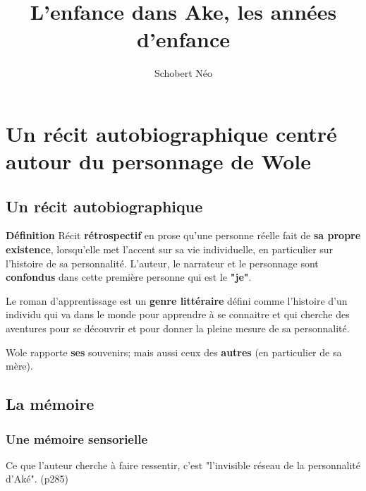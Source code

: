 \documentclass[a4paper, 11pt, hidelinks]{article}
\newcommand{\de}{\large \textbf{Définition} \large }
\newcommand{\bs}{\bigskip}
\begin{document}
\title{L'enfance dans Ake, les années d'enfance}
\author{Schobert Néo}

\maketitle

\tableofcontents


\newpage




\section{Un récit autobiographique centré autour du personnage de Wole}


\subsection{Un récit autobiographique}


\de Récit \textbf{rétrospectif} en prose qu'une personne réelle fait de \textbf{sa propre existence}, lorsqu'elle met l'accent sur sa vie individuelle,
en particulier sur l'histoire de sa personnalité.
L'auteur, le narrateur et le personnage sont \textbf{confondus} dans cette première personne qui est le \textbf{"je"}.

\bigskip
Le roman d'apprentissage est un \textbf{genre littéraire} défini comme l'histoire d'un individu qui va dans le monde pour apprendre à se connaitre
et qui cherche des aventures pour se découvrir et pour donner la pleine mesure de sa personnalité.

\smallskip
Wole rapporte \textbf{ses} souvenirs; mais aussi ceux des \textbf{autres} (en particulier de sa mère).







\subsection{La mémoire}

\subsubsection{Une mémoire sensorielle}



Ce que l'auteur cherche à faire ressentir, c'est "l'invisible réseau de la personnalité d'Aké". (p285)

\bs
\end{document}
